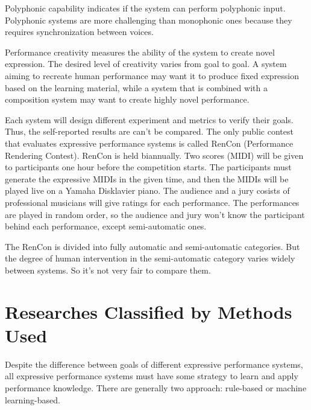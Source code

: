 Polyphonic capability indicates if the system can perform polyphonic input. Polyphonic systems are more challenging than monophonic ones because they requires synchronization between voices. 

Performance creativity measures the ability of the system to create novel expression. The desired level of creativity varies from goal to goal. A system aiming to recreate human performance may want it to produce fixed expression based on the learning material, while a system that is combined with a composition system may want to create highly novel performance. 

Each system will design different experiment and metrics to verify their goals. Thus, the self-reported results are can't be compared. The only public contest that evaluates expressive performance systems is called RenCon (Performance Rendering Contest)\cite{rencon}. RenCon is held biannually. Two scores (MIDI) will be given to participants one hour before the competition starts. The participants must generate the expressive MIDIs in the given time, and then the MIDIs will be played live on a Yamaha Disklavier piano. The audience and a jury cosists of professional musicians will give ratings for each performance. The performances are played in random order, so the audience and jury won't know the participant behind each performance, except semi-automatic ones. 

The RenCon is divided into fully automatic and semi-automatic categories. But the degree of human intervention in the semi-automatic category varies widely between systems. So it's not very fair to compare them.



\section{Researches Classified by Methods Used}
Despite the difference between goals of different expressive performance systems, all expressive performance systems must have some strategy to learn and apply performance knowledge. There are generally two approach: rule-based or machine learning-based.

